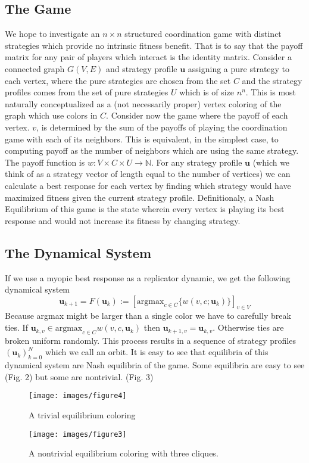 \documentclass[]{article}
\newcommand{\uu}{\mathbf{u}}
\begin{document}
\subsection{The Game}
We hope to investigate an $n\times n$ structured coordination game with distinct strategies which provide no intrinsic fitness benefit. That is to say that the payoff matrix for any pair of players which interact is the identity matrix. Consider a connected graph $G(V,E)$ and strategy profile $\uu$ assigning a pure strategy to each vertex, where the pure strategies are chosen from the set $C$ and the strategy profiles comes from the set of pure strategies $U$ which is of size $n^n$. This is most naturally conceptualized as a (not necessarily proper) vertex coloring of the graph which use colors in $C$. Consider now the game where the payoff of each vertex. $v$, is determined by the sum of the payoffs of playing the coordination game with each of its neighbors. This is equivalent, in the simplest case, to computing payoff as the number of neighbors which are using the same strategy. The payoff function is $w:V\times C\times U\rightarrow \mathbb{N}$.
For any strategy profile $\uu$ (which we think of as a strategy vector of length equal to the number of vertices) we can calculate a best response for each vertex by finding which strategy would have maximized fitness given the current strategy profile. Definitionaly, a Nash Equilibrium of this game is the state wherein every vertex is playing its best response and would not increase its fitness by changing strategy. 
\subsection{The Dynamical System}
If we use a myopic best response as a replicator dynamic, we get the following dynamical system
\begin{equation}
	\mathbf{u}_{k+1}=F(\mathbf{u}_k):=[\text{argmax}_{c\in C}\{w(v,c;\mathbf{u}_k)\} ]_{v\in V}
\end{equation}
Because argmax might be larger than a single color we have to carefully break ties. If $\mathbf{u}_{k,v}\in \text{argmax}_{c\in C}{w(v,c,\mathbf{u}_k)}$ then $\mathbf{u}_{k+1,v}=\mathbf{u}_{k,v}$. Otherwise ties are broken uniform randomly. This process results in a sequence of strategy profiles $(\mathbf{u}_k)_{k=0}^N$ which we call an orbit. It is easy to see that equilibria of this dynamical system are Nash equilibria of the game. Some equilibria are easy to see (Fig. 2) but some are nontrivial. (Fig. 3)
\begin{figure}[h!]
	\texttt{[image: images/figure4]}
	\caption{A trivial equilibrium coloring}
\end{figure}
\begin{figure}
	\texttt{[image: images/figure3]}
	\caption{A nontrivial equilibrium coloring with three cliques.}
\end{figure}
\end{document}

